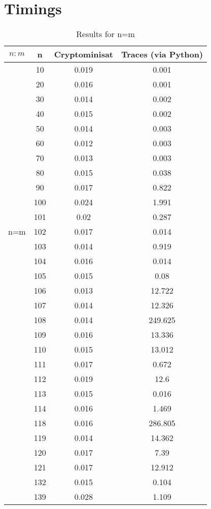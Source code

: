 
\chapter{Timings}\label{tim}

\begin{table}
	\centering
	\begin{tabular}{|c|c|c|c|}
		
		\hline
		$n:m$ & n & Cryptominisat & Traces (via Python) \\ \hline
		\multirow{23}{*}{n=m}
		& 10 & 0.019 & 0.001\\
		& 20 & 0.016 & 0.001\\
		& 30 & 0.014 & 0.002\\
		& 40 & 0.015 & 0.002\\
		& 50 & 0.014 & 0.003\\
		& 60 & 0.012 & 0.003\\
		& 70 & 0.013 & 0.003\\
		& 80 & 0.015 & 0.038\\
		& 90 & 0.017 & 0.822\\
		& 100 & 0.024 & 1.991\\
		& 101 & 0.02 & 0.287\\
		& 102 & 0.017 & 0.014\\
		& 103 & 0.014 & 0.919\\
		& 104 & 0.016 & 0.014\\
		& 105 & 0.015 & 0.08\\
		& 106 & 0.013 & 12.722\\
		& 107 & 0.014 & 12.326\\
		& 108 & 0.014 & 249.625\\
		& 109 & 0.016 & 13.336\\
		& 110 & 0.015 & 13.012\\
		& 111 & 0.017 & 0.672\\
		& 112 & 0.019 & 12.6\\
		& 113 & 0.015 & 0.016\\
		& 114 & 0.016 & 1.469\\
		& 118 & 0.016 & 286.805\\
		& 119 & 0.014 & 14.362\\
		& 120 & 0.017 & 7.39\\
		& 121 & 0.017 & 12.912\\
		& 132 & 0.015 & 0.104\\
		& 139 & 0.028 & 1.109\\
		\hline
	\end{tabular}
	
	\caption{Results for n=m}
\end{table}
